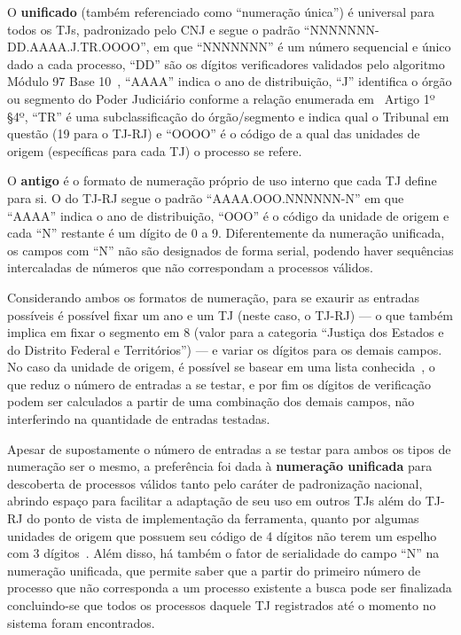 O \textbf{unificado} (também referenciado como ``numeração única'') é universal
para todos os TJs, padronizado pelo CNJ
\cite{spec:cnj-numeração-única,spec:cnj-numeração-única-resolução} e segue o
padrão ``NNNNNNN-DD.AAAA.J.TR.OOOO'', em que ``NNNNNNN'' é um número sequencial
e único dado a cada processo, ``DD'' são os dígitos verificadores validados
pelo algoritmo Módulo 97 Base 10~\cite{spec:iso-modulo-97}, ``AAAA'' indica o
ano de distribuição, ``J'' identifica o órgão ou segmento do Poder Judiciário
conforme a relação enumerada em~\cite{spec:cnj-numeração-única-resolução}
Artigo 1º \S 4º, ``TR'' é uma subclassificação do órgão/segmento e indica qual
o Tribunal em questão (19 para o TJ-RJ) e ``OOOO'' é o código de a qual das
unidades de origem (específicas para cada TJ) o processo se refere.

O \textbf{antigo} é o formato de numeração próprio de uso interno que cada TJ
define para si. O do TJ-RJ segue o padrão ``AAAA.OOO.NNNNNN-N'' em que ``AAAA''
indica o ano de distribuição, ``OOO'' é o código da unidade de origem e cada
``N'' restante é um dígito de 0 a 9. Diferentemente da numeração unificada, os
campos com ``N'' não são designados de forma serial, podendo haver sequências
intercaladas de números que não correspondam a processos válidos.

Considerando ambos os formatos de numeração, para se exaurir as entradas
possíveis é possível fixar um ano e um TJ (neste caso, o TJ-RJ) --- o que
também implica em fixar o segmento em 8 (valor para a categoria ``Justiça dos
Estados e do Distrito Federal e Territórios'') --- e variar os dígitos para os
demais campos. No caso da unidade de origem, é possível se basear em uma lista
conhecida~\cite{spec:tjrj-codigos-unidades-de-origem}, o que reduz o número de
entradas a se testar, e por fim os dígitos de verificação podem ser calculados
a partir de uma combinação dos demais campos, não interferindo na quantidade de
entradas testadas.

Apesar de supostamente o número de entradas a se testar para ambos os tipos de
numeração ser o mesmo, a preferência foi dada à \textbf{numeração unificada}
para descoberta de processos válidos tanto pelo caráter de padronização
nacional, abrindo espaço para facilitar a adaptação de seu uso em outros TJs
além do TJ-RJ do ponto de vista de implementação da ferramenta, quanto por
algumas unidades de origem que possuem seu código de 4 dígitos não terem um
espelho com 3 dígitos~\cite{spec:tjrj-codigos-unidades-de-origem}. Além disso,
há também o fator de serialidade do campo ``N'' na numeração unificada, que
permite saber que a partir do primeiro número de processo que não corresponda a
um processo existente a busca pode ser finalizada concluindo-se que todos os
processos daquele TJ registrados até o momento no sistema foram encontrados.

